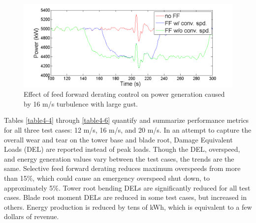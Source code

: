 \begin{figure}[htb]
	\centering
		\includegraphics[width = \linewidth]{Figures/ch4Figures/fig4-31.png}
		
	\caption{Effect of feed forward derating control on power generation caused by 16 m/s turbulence with large gust.}
	\label{fig4-31}
\end{figure}

Tables \ref{table4-4} through \ref{table4-6} quantify and summarize performance metrics for all three test cases: 12 m/s, 16 m/s, and 20 m/s. In an attempt to capture the overall wear and tear on the tower base and blade root, Damage Equivalent Loads (DEL) are reported instead of peak loads. Though the DEL, overspeed, and energy generation values vary between the test cases, the trends are the same. Selective feed forward derating reduces maximum overspeeds from more than 15\%, which could cause an emergency overspeed shut down, to approximately 5\%. Tower root bending DELs are significantly reduced for all test cases. Blade root moment DELs are reduced in some test cases, but increased in others. Energy production is reduced by tens of kWh, which is equivalent to a few dollars of revenue.


